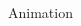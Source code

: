 \documentclass{beamer}
\begin{document}
\begin{frame}{}
\begin{columns}[t]
\begin{column}{0.245\linewidth}







\end{column}%

\begin{column}{0.245\linewidth}

\begin{block}{Animation}
\vspace{0.5em}


\end{block}
\end{column}
\end{columns}
\end{frame}
\end{document}
